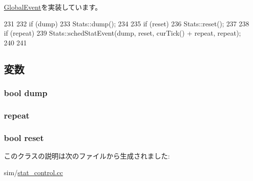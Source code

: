 \hyperlink{classGlobalEvent_a142b75b68a6291400e20fb0dd905b1c8}{GlobalEvent}を実装しています。


\begin{DoxyCode}
231     {
232         if (dump)
233             Stats::dump();
234 
235         if (reset)
236             Stats::reset();
237 
238         if (repeat) {
239             Stats::schedStatEvent(dump, reset, curTick() + repeat, repeat);
240         }
241     }
\end{DoxyCode}


\subsection{変数}
\hypertarget{classStats_1_1StatEvent_aa833038bb03159a6825c0bbc29789875}{
\subsubsection[{dump}]{\setlength{\rightskip}{0pt plus 5cm}bool {\bf dump}}}
\label{classStats_1_1StatEvent_aa833038bb03159a6825c0bbc29789875}
\hypertarget{classStats_1_1StatEvent_a186e97c430ff343e8ab14129eaa8375d}{
\subsubsection[{repeat}]{ {\bf repeat}}}
\label{classStats_1_1StatEvent_a186e97c430ff343e8ab14129eaa8375d}
\hypertarget{classStats_1_1StatEvent_a8409a0d351d4fba2eeef26a7dcc585a8}{
\subsubsection[{reset}]{\setlength{\rightskip}{0pt plus 5cm}bool {\bf reset}}}
\label{classStats_1_1StatEvent_a8409a0d351d4fba2eeef26a7dcc585a8}


このクラスの説明は次のファイルから生成されました:\begin{DoxyCompactItemize}
\item 
sim/\hyperlink{stat__control_8cc}{stat\_\-control.cc}\end{DoxyCompactItemize}
